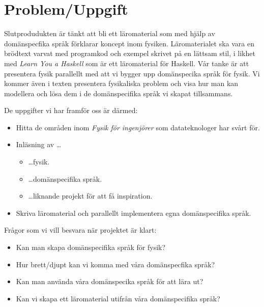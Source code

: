 \documentclass[12pt,a4paper]{article}
\begin{document}
%

\section{Problem/Uppgift}

Slutprodudukten är tänkt att bli ett läromaterial som med hjälp av domänspecfika
språk förklarar koncept inom fysiken. Läromaterialet ska vara en brödtext varvat
med programkod och exempel skrivet på en lättsam stil, i likhet med
\textit{Learn You a Haskell}\cite{LYAH} som är ett läromaterial för Haskell. Vår
tanke är att presentera fysik parallellt med att vi bygger upp domänspecika
språk för fysik. Vi kommer även i texten presentera fysikaliska problem och visa
hur man kan modellera och lösa dem i de domänspecifika språk vi skapat
tillsammans.

De uppgifter vi har framför oss är därmed:

\begin{itemize}
        \item Hitta de områden inom \textit{Fysik för ingenjörer} som
          datateknologer har svårt för.  \item Inläsning av \dots
	\begin{itemize}
		\item \dots fysik.
		\item \dots domänspecifika språk.
		\item \dots liknande projekt för att få inspiration.
	\end{itemize}
        \item Skriva läromaterial och parallellt implementera egna
      domänspecifika språk.  
\end{itemize}


Frågor som vi vill besvara när projektet är klart:
\begin{itemize}
    \item Kan man skapa domänspecifika språk för fysik?
    \item Hur brett/djupt kan vi komma med våra domänspecfika språk?
    \item Kan man använda våra domänspecika språk för att lära ut?
    \item Kan vi skapa ett läromaterial utifrån våra domänspecifika språk?
\end{itemize}
\end{document}
